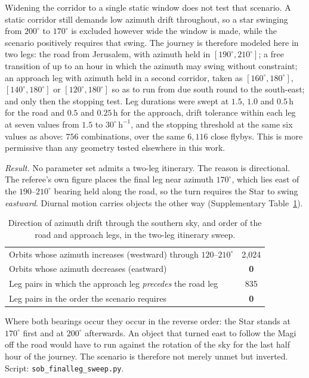 \documentclass[11pt,a4paper]{article}
\begin{document}
Widening the corridor to a single static window does not test that scenario. A
static corridor still demands low azimuth drift throughout, so a star swinging
from $200^\circ$ to $170^\circ$ is excluded however wide the window is made,
while the scenario positively requires that swing. The journey is therefore
modeled here in two legs: the road from Jerusalem, with azimuth held in
$[190^\circ, 210^\circ]$; a free transition of up to an hour in which the
azimuth may swing without constraint; an approach leg with azimuth held in a
second corridor, taken as $[160^\circ,180^\circ]$, $[140^\circ,180^\circ]$ or
$[120^\circ,180^\circ]$ so as to run from due south round to the south-east;
and only then the stopping test. Leg durations were swept at $1.5$, $1.0$ and
$0.5$\,h for the road and $0.5$ and $0.25$\,h for the approach, drift tolerance
within each leg at seven values from $1.5$ to $30^\circ\,\mathrm{h}^{-1}$, and
the stopping threshold at the same six values as above: $756$ combinations,
over the same $6{,}116$ close flybys. This is more permissive than any geometry
tested elsewhere in this work.

\emph{Result.} No parameter set admits a two-leg itinerary. The reason is
directional. The referee's own figure places the final leg near azimuth
$170^\circ$, which lies east of the $190$--$210^\circ$ bearing held along the
road, so the turn requires the Star to swing \emph{eastward}. Diurnal motion
carries objects the other way (Supplementary Table~\ref{tab:twolegdir}).

\begin{table}[htbp]
\centering
\caption{Direction of azimuth drift through the southern sky, and order of the road and approach legs, in the two-leg itinerary sweep.}\label{tab:twolegdir}
\begin{tabular}{@{}lc@{}}
\toprule
Orbits whose azimuth increases (westward) through $120$--$210^\circ$ & 2{,}024 \\
Orbits whose azimuth decreases (eastward) & \textbf{0} \\
\midrule
Leg pairs in which the approach leg \emph{precedes} the road leg & 835 \\
Leg pairs in the order the scenario requires & \textbf{0} \\
\bottomrule
\end{tabular}
\end{table}

Where both bearings occur they occur in the reverse order: the Star stands at
$170^\circ$ first and at $200^\circ$ afterwards. An object that turned east to
follow the Magi off the road would have to run against the rotation of the sky
for the last half hour of the journey. The scenario is therefore not merely
unmet but inverted. Script: \texttt{sob\_finalleg\_sweep.py}.
\end{document}
